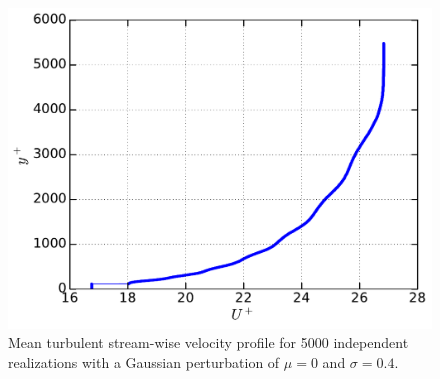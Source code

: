 \documentclass[aps,reprint,amsmath,amssymb,prl]{revtex4-1}%
\begin{document}
\begin{figure}[b]
\includegraphics[scale=0.46]{figures/Master_averaged_step_profile_5000_assembles}
\caption{\label{fig:mean_profile} Mean turbulent stream-wise velocity profile for 5000 independent realizations with a Gaussian perturbation of $\mu=0$ and $\sigma=0.4$.}
\end{figure} 

\end{document}
